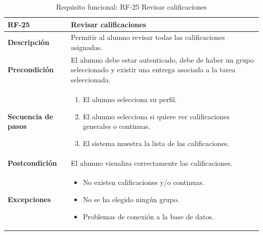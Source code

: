 \begin{table}[H]
\centering
\begin{tabularx}{\textwidth}{
  |>{\centering\arraybackslash}l
  |>{\centering\arraybackslash}X|}
\hline
\textbf{RF-25} & \textbf{Revisar calificaciones} \\ \hline

\textbf{Descripción} & Permitir al alumno revisar todas las calificaciones asignadas. \\ \hline

\textbf{Precondición} & El alumno debe estar autenticado, debe de haber un grupo seleccionado y existir una entrega asociada a la tarea seleccionada. \\ \hline

\textbf{Secuencia de pasos} &
\begin{enumerate}
  \item El alumno selecciona su perfil.
  \item El alumno selecciona si quiere ver calificaciones generales o continuas.
  \item El sistema muestra la lista de las calificaciones.
\end{enumerate} \\ \hline

\textbf{Postcondición} & El alumno visualiza correctamente las calificaciones. \\ \hline

\textbf{Excepciones} &
\begin{itemize}
  \item No existen calificaciones y/o continuas.
  \item No se ha elegido ningún grupo.
  \item Problemas de conexión a la base de datos.
\end{itemize} \\ \hline
\end{tabularx}
\caption{Requisito funcional: RF-25 Revisar calificaciones}
\label{tab:RF-25}
\end{table}
